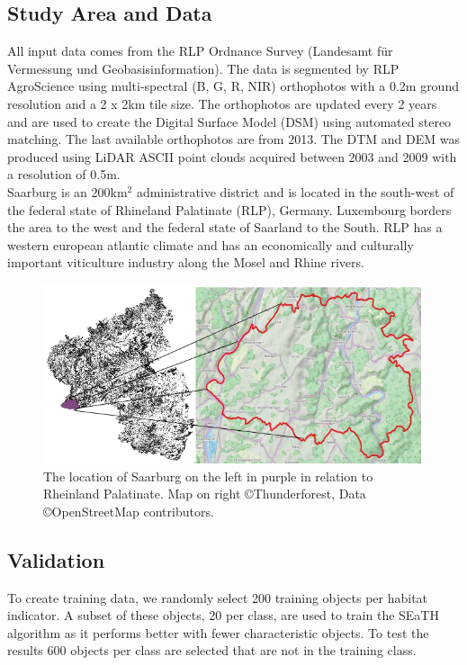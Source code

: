 \documentclass[authoryear, review,12pt,number]{elsarticle}
\begin{document}
\subsection{Study Area and Data}
All input data comes from the RLP Ordnance Survey (Landesamt f\"ur Vermessung
und Geobasisinformation). The data is segmented by RLP AgroScience using
multi-spectral (B, G, R, NIR) orthophotos with a 0.2m ground resolution and a 2
x 2km tile size. The orthophotos are updated every 2 years and are used to
create the Digital Surface Model (DSM) using automated stereo matching. The
last available orthophotos are from 2013. The DTM and DEM was produced using
LiDAR ASCII point clouds acquired between 2003 and 2009 with a resolution of
0.5m.\\
Saarburg is an 200km$^{2}$ administrative district and is located in the
south-west of the federal state of Rhineland Palatinate (RLP), Germany.
Luxembourg borders the area to the west and the federal state of Saarland to
the South.  RLP has a western european atlantic climate and has an economically
and culturally important viticulture industry along the Mosel and Rhine rivers.
\begin{figure}
    \includegraphics[width=\textwidth]{diagrams/study_area_closeup.png}
    \caption{The location of Saarburg on the left in purple in relation to
    Rheinland Palatinate. Map on right \copyright Thunderforest, Data
\copyright OpenStreetMap contributors.} \end{figure}

\subsection{Validation} To create training data, we randomly select 200
training objects per habitat indicator. A subset of these objects, 20 per
class, are used to train the SEaTH algorithm as it performs better with fewer
characteristic objects. To test the results 600 objects per class are selected
that are not in the training class.
\end{document}
